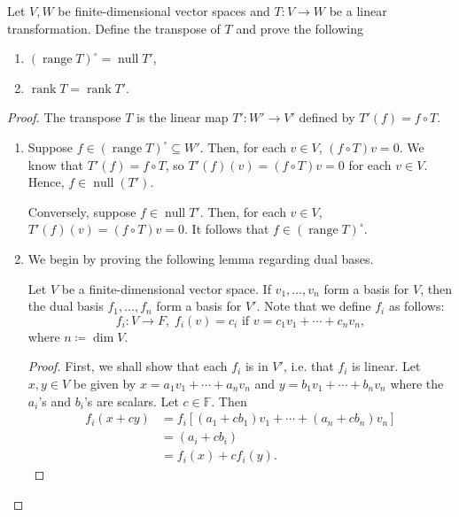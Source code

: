 \documentclass{article}
\begin{document}
\begin{problem}
Let \(V, W\) be finite-dimensional vector spaces and \(T:V\to W\) be a linear
transformation.  Define the transpose of \(T\) and prove the following
\begin{enumerate}
	\item \((\operatorname{range} T)^{\circ} = \operatorname{null} T'\),
	\item \(\operatorname{rank} T = \operatorname{rank} T'\).
\end{enumerate}
\end{problem}
\begin{proof}
	The transpose \(T\) is the linear map \(T': W'\to V'\) defined by \(T'(f)
	= f\circ T\).

	\begin{enumerate}
		\item Suppose \(f\in (\operatorname{range} T)^{\circ}\subseteq W'\).  Then,
		      for each \(v\in V\), \((f\circ T) v = 0\).  We know that \(T'(f) = f\circ
		      T\), so \(T'(f)(v) = (f\circ T) v = 0\) for each \(v\in V\).  Hence,
		      \(f\in \operatorname{null}(T')\).

		      Conversely, suppose \(f\in \operatorname{null} T'\).  Then, for each
		      \(v\in V\), \(T'(f)(v) = (f\circ T) v = 0\).  It follows that \(f\in
		      (\operatorname{range} T)^{\circ}\).
		\item We begin by proving the following lemma regarding dual bases.

		      \begin{lemma}\label{lem:dual_basis_is_basis}
			      Let \(V\) be a finite-dimensional vector space.  If \(v_1, \ldots,
			      v_n\) form a basis for \(V\), then the dual basis \(f_1, \ldots, f_n\)
			      form a basis for \(V'\).  Note that we define \(f_i\) as follows:
			      \[
				      f_i\colon V\to F,\;f_i(v) = c_i \text{ if } v = c_1v_1 + \cdots + c_nv_n
				      ,\]
			      where \(n\coloneqq \dim V\).
		      \end{lemma}
		      \begin{proof}
			      First, we shall show that each \(f_i\) is in \(V'\), i.e. that
			      \(f_i\) is linear.  Let \(x,y\in V\) be given by \(x = a_1v_1 +
			      \cdots + a_nv_n\) and \(y = b_1v_1 + \cdots + b_nv_n\) where the
			      \(a_i\)'s and \(b_i\)'s are scalars.  Let \(c\in \mathbb{F}\).
			      Then
			      \begin{align*}
				      f_i(x+cy) & = f_i \left[(a_1+cb_1)v_1 + \cdots + (a_n+cb_n)v_n \right] \\
				                & = (a_i+cb_i)                                               \\
				                & = f_i \left(x\right) + c f_i(y)
				      .\end{align*}


\end{proof}
\end{enumerate}
\end{proof}
\end{document}
